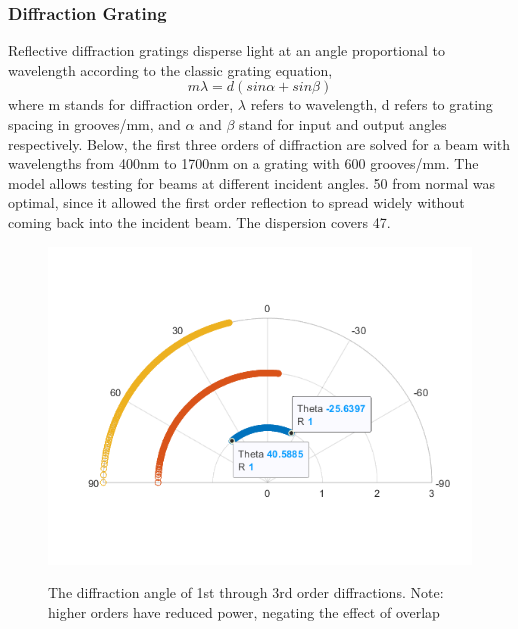 \documentclass[journal]{IEEEtran}
\begin{document}
\subsubsection{Diffraction Grating}
Reflective diffraction gratings disperse light at an angle proportional to wavelength according to the classic grating equation,
\begin{equation}
    m\lambda = d(sin\alpha + sin\beta)
\end{equation}
where m stands for diffraction order, $\lambda$ refers to wavelength, d refers to grating spacing in grooves/mm, and $\alpha$ and $\beta$ stand for input and output angles respectively. Below, the first three orders of diffraction are solved for a beam with wavelengths from 400nm to 1700nm on a grating with 600 grooves/mm. The model allows testing for beams at different incident angles. 50\textdegree \: from normal was optimal, since it allowed the first order reflection to spread widely without coming back into the incident beam. The dispersion covers 47\textdegree.
\begin{figure}[H]
    \centering
    \includegraphics[scale=0.5]{images/PolarPlot.png}
    \label{fig:diffraction-angle}
    \caption{The diffraction angle of 1st through 3rd order diffractions. Note: higher orders have reduced power, negating the effect of overlap}
\end{figure}
\end{document}
